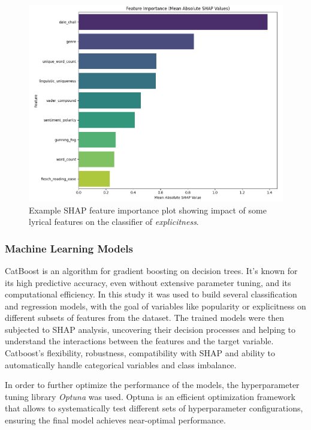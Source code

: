 \begin{center}
\begin{figure}[H]
  \centering
  \includegraphics[width=6in]{img/shap_feature_importance.png}
  \caption{Example SHAP feature importance plot showing impact of some lyrical features
  on the classifier of \textit{explicitness}.}
  \label{Figure:shap_feature_importance}
\end{figure}
\end{center}

\subsubsection*{Machine Learning Models}
CatBoost is an algorithm for gradient boosting on decision trees. It's known
for its high predictive accuracy, even without extensive parameter tuning, and
its computational efficiency. In this study it was used to build several
classification and regression models, with the goal of variables like
popularity or explicitness on different subsets of features from the dataset.
The trained models were then subjected to SHAP analysis, uncovering their
decision processes and helping to understand the interactions between the
features and the target variable. Catboost's flexibility, robustness,
compatibility with SHAP and ability to automatically handle categorical
variables and class imbalance.\cite{catboost}


In order to further optimize the performance of the models, the
hyperparameter tuning library \textit{Optuna} was used. Optuna is an
efficient optimization framework that allows to systematically test different
sets of hyperparameter configurations, ensuring the final model achieves
near-optimal performance.\cite{optuna} 

